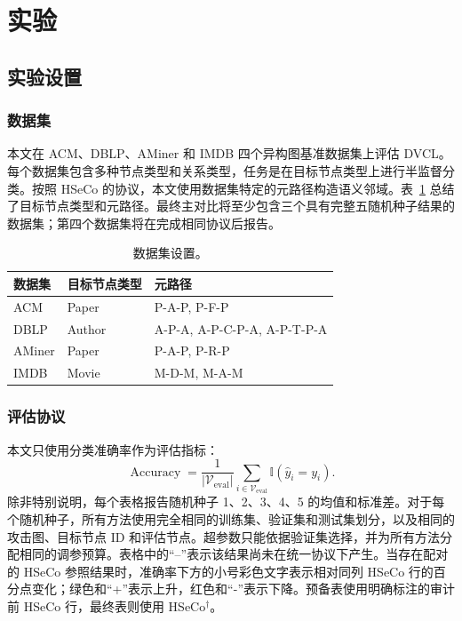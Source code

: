 \section{实验}
\label{sec:experiments-zh}

\subsection{实验设置}

\subsubsection{数据集}

本文在 ACM、DBLP、AMiner 和 IMDB 四个异构图基准数据集上评估 DVCL。每个数据集包含多种节点类型和关系类型，任务是在目标节点类型上进行半监督分类。按照 HSeCo 的协议，本文使用数据集特定的元路径构造语义邻域。表~\ref{tab:dataset_settings_zh} 总结了目标节点类型和元路径。最终主对比将至少包含三个具有完整五随机种子结果的数据集；第四个数据集将在完成相同协议后报告。

\begin{table}[htbp]
\centering
\caption{数据集设置。}
\label{tab:dataset_settings_zh}
\begin{tabular}{lll}
\toprule
数据集 & 目标节点类型 & 元路径 \\
\midrule
ACM & Paper & P-A-P, P-F-P \\
DBLP & Author & A-P-A, A-P-C-P-A, A-P-T-P-A \\
AMiner & Paper & P-A-P, P-R-P \\
IMDB & Movie & M-D-M, M-A-M \\
\bottomrule
\end{tabular}
\end{table}

\subsubsection{评估协议}

本文只使用分类准确率作为评估指标：
\begin{equation}
\operatorname{Accuracy}
=\frac{1}{|\mathcal{V}_{\mathrm{eval}}|}
\sum_{i\in\mathcal{V}_{\mathrm{eval}}}
\mathbb{I}(\hat{y}_i=y_i).
\end{equation}
除非特别说明，每个表格报告随机种子 1、2、3、4、5 的均值和标准差。对于每个随机种子，所有方法使用完全相同的训练集、验证集和测试集划分，以及相同的攻击图、目标节点 ID 和评估节点。超参数只能依据验证集选择，并为所有方法分配相同的调参预算。表格中的“--”表示该结果尚未在统一协议下产生。当存在配对的 HSeCo 参照结果时，准确率下方的小号彩色文字表示相对同列 HSeCo 行的百分点变化；绿色和“+”表示上升，红色和“-”表示下降。预备表使用明确标注的审计前 HSeCo 行，最终表则使用 HSeCo$^{\dagger}$。

